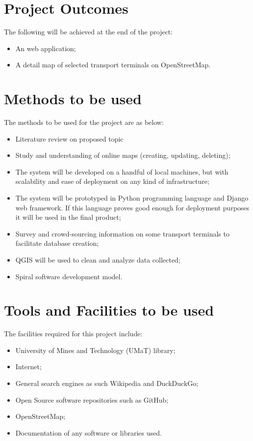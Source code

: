 \section{Project Outcomes}
The following will be achieved at the end of the project:
\begin{itemize}
	\item An web application;
	\item A detail map of selected transport terminals on OpenStreetMap.
\end{itemize}


\section{Methods to be used}
The methods to be used for the project are as below:
\begin{itemize}
	\item Literature review on proposed topic
	\item Study and understanding of online maps (creating, updating, deleting);
	\item The system will be developed on a handful of local machines, but with scalability and ease of deployment on any kind of infrastructure;
	\item The system will be prototyped in Python programming language and Django web framework. If this language proves good enough for deployment purposes it will be used in the final product;
	\item Survey and crowd-sourcing information on some transport terminals to facilitate database creation;
	\item QGIS will be used to clean and analyze data collected;
	\item Spiral software development model.
\end{itemize}

\section{Tools and Facilities to be used}
The facilities required for this project include:
\begin{itemize}
	\item University of Mines and Technology (UMaT) library;
	\item Internet;
	\item General search engines as such Wikipedia and DuckDuckGo;
	\item Open Source software repositories such as GitHub;
	\item OpenStreetMap;
	\item Documentation of any software or libraries used.
\end{itemize}

